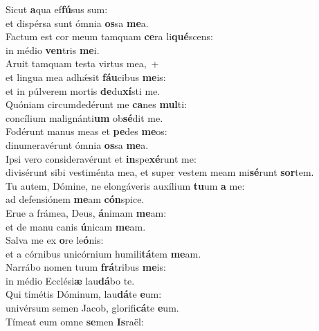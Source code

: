 \evenverse Sicut \textbf{a}qua ef\textbf{fú}sus sum:~\*\\
\evenverse et dispérsa sunt ómnia \textbf{os}sa \textbf{me}a.\\
\oddverse Factum est cor meum tamquam \textbf{ce}ra li\textbf{qué}scens:~\*\\
\oddverse in médio \textbf{ven}tris \textbf{me}i.\\
\evenverse Aruit tamquam testa virtus mea,~+\\
\evenverse  et lingua mea adhǽsit \textbf{fáu}cibus \textbf{me}is:~\*\\
\evenverse et in púlverem mortis \textbf{de}du\textbf{xí}sti me.\\
\oddverse Quóniam circumdedérunt me \textbf{ca}nes \textbf{mul}ti:~\*\\
\oddverse concílium malignánti\textbf{um} ob\textbf{sé}dit me.\\
\evenverse Fodérunt manus meas et \textbf{pe}des \textbf{me}os:~\*\\
\evenverse dinumeravérunt ómnia \textbf{os}sa \textbf{me}a.\\
\oddverse Ipsi vero consideravérunt et \textbf{in}spe\textbf{xé}runt me:~\*\\
\oddverse divisérunt sibi vestiménta mea, et super vestem meam mi\textbf{sé}runt \textbf{sor}tem.\\
\evenverse Tu autem, Dómine, ne elongáveris auxílium \textbf{tu}um \textbf{a} me:~\*\\
\evenverse ad defensiónem \textbf{me}am \textbf{cón}spice.\\
\oddverse Erue a frámea, Deus, \textbf{á}nimam \textbf{me}am:~\*\\
\oddverse et de manu canis \textbf{ú}nicam \textbf{me}am.\\
\evenverse Salva me ex \textbf{o}re le\textbf{ó}nis:~\*\\
\evenverse et a córnibus unicórnium humili\textbf{tá}tem \textbf{me}am.\\
\oddverse Narrábo nomen tuum \textbf{frá}tribus \textbf{me}is:~\*\\
\oddverse in médio Ecclési\textbf{æ} lau\textbf{dá}bo te.\\
\evenverse Qui timétis Dóminum, lau\textbf{dá}te \textbf{e}um:~\*\\
\evenverse univérsum semen Jacob, glorifi\textbf{cá}te \textbf{e}um.\\
\oddverse Tímeat eum omne \textbf{se}men \textbf{Is}raël:~\*\\
